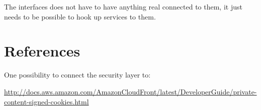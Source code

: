 \documentclass[a4paper,12pt]{article}
\begin{document}
The interfaces does not have to have anything real connected to them, it just needs 
to be possible to hook up services to them.



\section{References}
    One possibility to connect the security layer to:

\url{http://docs.aws.amazon.com/AmazonCloudFront/latest/DeveloperGuide/private-content-signed-cookies.html}

    
\end{document}
